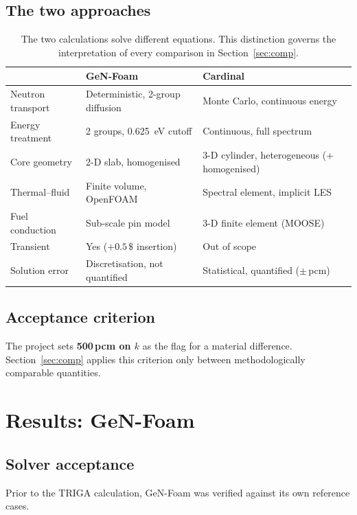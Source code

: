 \documentclass[11pt,a4paper]{article}
\newcommand{\pcm}{\,pcm}
\begin{document}
\subsection{The two approaches}
\begin{table}[H]\centering\small
\caption{The two calculations solve different equations. This distinction governs the
interpretation of every comparison in Section~\ref{sec:comp}.}
\begin{tabular}{@{}lll@{}}
\toprule
 & \textbf{GeN-Foam} & \textbf{Cardinal}\\
\midrule
Neutron transport & Deterministic, 2-group diffusion & Monte Carlo, continuous energy\\
Energy treatment & 2 groups, \SI{0.625}{\electronvolt} cutoff & Continuous, full spectrum\\
Core geometry & 2-D slab, homogenised & 3-D cylinder, heterogeneous (+ homogenised)\\
Thermal--fluid & Finite volume, OpenFOAM & Spectral element, implicit LES\\
Fuel conduction & Sub-scale pin model & 3-D finite element (MOOSE)\\
Transient & Yes ($+0.5\,\$$ insertion) & Out of scope\\
Solution error & Discretisation, not quantified & Statistical, quantified ($\pm$\,pcm)\\
\bottomrule
\end{tabular}
\end{table}

\subsection{Acceptance criterion}
The project sets \textbf{500\pcm{} on $k$} as the flag for a material difference.
Section~\ref{sec:comp} applies this criterion only between
methodologically comparable quantities.

\newpage
\section{Results: GeN-Foam}
\subsection{Solver acceptance}
Prior to the TRIGA calculation, GeN-Foam was verified against its own reference cases.
\end{document}
